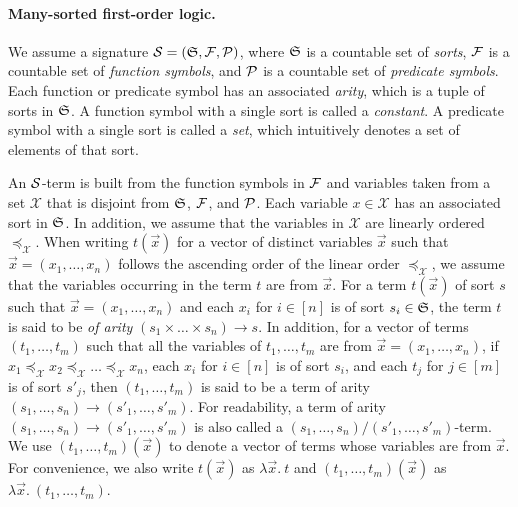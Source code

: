 \hide
{

\paragraph{Many-sorted first-order logic.}
We assume a signature $\mathcal{S}=({\mathfrak{S}}, {\mathcal{F}}, {\mathcal{P}})$, where ${\mathfrak{S}}$ is a countable set of \emph{sorts}, ${\mathcal{F}}$ is a countable set of \emph{function symbols}, and ${\mathcal{P}}$ is a countable set of \emph{predicate symbols}. Each function or predicate symbol has an associated \emph{arity}, which is a tuple of sorts in ${\mathfrak{S}}$.  A function symbol with a single sort is called a \emph{constant}. A predicate symbol with a single sort is called a \emph{set}, which intuitively denotes a set of elements of that sort.

An $\mathcal{S}$-term is built from the function symbols in ${\mathcal{F}}$ and variables taken from a set $\mathcal{X}$ that is disjoint from ${\mathfrak{S}}$, ${\mathcal{F}}$, and ${\mathcal{P}}$. Each variable $x \in \mathcal{X}$ has an associated sort in ${\mathfrak{S}}$. In addition, we assume that the variables in $\mathcal{X}$ are linearly ordered $\preceq_{\mathcal{X}}$. When writing $t(\vec{x})$ for a vector of distinct variables $\vec{x}$ such that $\vec{x} = (x_1,\dots, x_n)$ follows the ascending order of the linear order $\preceq_{\mathcal{X}}$, we assume that the variables occurring in the term $t$ are from $\vec{x}$. For a term $t(\vec{x})$ of sort $s$ such that $\vec{x} = (x_1, \dots, x_n)$ and each $x_i$ for $i \in [n]$ is of sort $s_i \in {\mathfrak{S}}$, the term $t$ is said to be \emph{of arity} $(s_1 \times \dots \times s_n) \rightarrow s$. In addition, for a vector of terms $(t_1, \dots, t_m)$ such that all the variables of $t_1 ,\dots, t_m$ are from $\vec{x} = (x_1, \dots, x_n)$, if $x_1 \preceq_{\mathcal{X}} x_2  \preceq_{\mathcal{X}} \dots  \preceq_{\mathcal{X}} x_n$, each $x_i$ for $i \in [n]$ is of sort $s_i$, and each $t_j$ for $j \in [m]$ is of sort $s'_j$, then $(t_1,\dots, t_m)$ is said to be a term of arity $(s_1,\dots, s_n) \rightarrow (s'_1,\dots, s'_m)$. For readability, a term of arity $(s_1,\dots, s_n) \rightarrow (s'_1,\dots, s'_m)$ is also called a $(s_1,\dots, s_n) \big/ (s'_1,\dots, s'_m)$-term. We use $(t_1,\dots, t_m)(\vec{x})$ to denote a vector of terms whose variables are from $\vec{x}$.  For convenience, we also write $t(\vec{x})$ as $\lambda \vec{x}.\ t$ and $(t_1,\dots, t_m)(\vec{x})$ as $\lambda \vec{x}.\ (t_1,\dots, t_m)$. 

}
